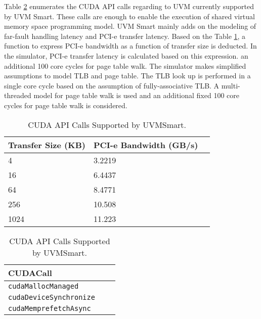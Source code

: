 Table \ref{tab:apis} enumerates the CUDA API calls regarding to UVM currently supported by UVM Smart. These calls are enough to enable the execution of shared virtual memory space programming model. UVM Smart mainly adds on the modeling of far-fault handling latency and PCI-e transfer latency. Based on the Table \ref{tab:pcie}, a function to express PCI-e bandwidth as a function of transfer size is deducted. In the simulator, PCI-e transfer latency is calculated based on this expression.  an additional 100 core cycles for page table walk. The simulator makes simplified assumptions to model TLB and page table. The TLB look up is performed in a single core cycle based on the assumption of fully-associative TLB. A multi-threaded model for page table walk is used and an additional fixed 100 core cycles for page table walk is considered.

    \begin{table}[!htbp]
        \centering
        \setlength{\abovecaptionskip}{6pt plus 1pt minus 1pt}
        \captionsetup{width=.75\textwidth}
        \caption {CUDA API Calls Supported by UVMSmart.}
            \begin{tabular}{|l|l|c|}
                \hline
                \textbf{Transfer Size (KB)} & \textbf{PCI-e Bandwidth (GB/s)} \\
                \hline
                4 & 3.2219 \\
                \hline
                16 & 6.4437 \\ 
                \hline
                64 & 8.4771  \\
                \hline
	        256 & 10.508  \\
                \hline
		1024 & 11.223  \\
                \hline
            \end{tabular}
        \label{tab:pcie}
    \end{table}

    \begin{table}[!htbp]
        \centering
        \setlength{\abovecaptionskip}{6pt plus 1pt minus 1pt}
        \captionsetup{width=.75\textwidth}
        \caption {CUDA API Calls Supported by UVMSmart.}
            \begin{tabular}{|l|c|c|}
                \hline
                CUDACall  \\
                \hline
                \hline
                \texttt{cudaMallocManaged}  \\
                \hline
                \texttt{cudaDeviceSynchronize}  \\
                \hline
                \texttt{cudaMemprefetchAsync}  \\
                \hline
            \end{tabular}
        \label{tab:apis}
    \end{table}
    
